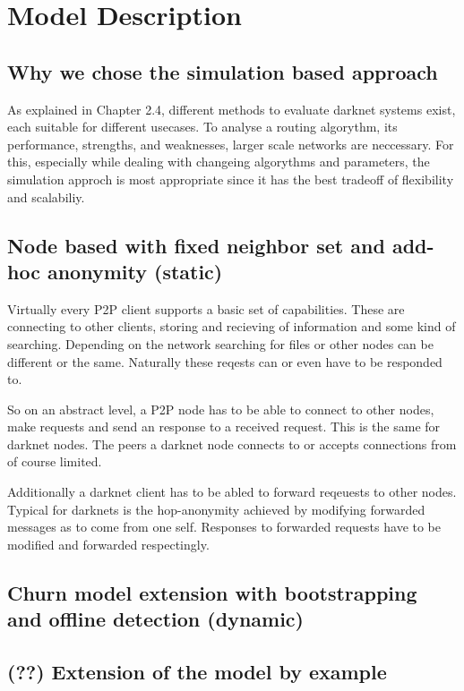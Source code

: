 \chapter{Model Description}

\section{Why we chose the simulation based approach}

As explained in Chapter 2.4, different methods to evaluate darknet systems exist, each suitable for different usecases. To analyse a routing algorythm, its performance, strengths, and weaknesses, larger scale networks are neccessary. For this, especially while dealing with changeing algorythms and parameters, the simulation approch is most appropriate since it has the best tradeoff of flexibility and scalabiliy.

\section{Node based with fixed neighbor set and add-hoc anonymity (static)}

Virtually every P2P client supports a basic set of capabilities. These are connecting to other clients, storing and recieving of information and some kind of searching. Depending on the network searching for files or other nodes can be different or the same. Naturally these reqests can or even have to be responded to.

So on an abstract level, a P2P node has to be able to connect to other nodes, make requests and send an response to a received request. This is the same for darknet nodes. The peers a darknet node connects to or accepts connections from of course limited.

Additionally a darknet client has to be abled to forward reqeuests to other nodes. Typical for darknets is the hop-anonymity achieved by modifying forwarded messages as to come from one self. Responses to forwarded requests have to be modified and forwarded respectingly.

\section{Churn model extension with bootstrapping and offline detection (dynamic)}
\section{(??) Extension of the model by example}

